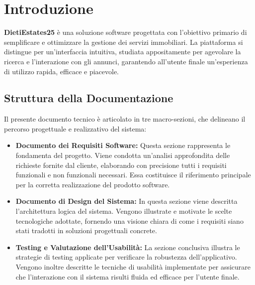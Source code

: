 \chapter*{Introduzione}

\textbf{DietiEstates25} è una soluzione software progettata con l'obiettivo primario di semplificare 
e ottimizzare la gestione dei servizi immobiliari. La piattaforma si distingue per un'interfaccia 
intuitiva, studiata appositamente per agevolare la ricerca e l'interazione con gli annunci, garantendo 
all'utente finale un'esperienza di utilizzo rapida, efficace e piacevole.

\section*{Struttura della Documentazione}

Il presente documento tecnico è articolato in tre macro-sezioni, che delineano il percorso progettuale 
e realizzativo del sistema:

\begin{itemize}
    \item \textbf{Documento dei Requisiti Software:} Questa sezione rappresenta le fondamenta del progetto. 
    Viene condotta un'analisi approfondita delle richieste fornite dal cliente, elaborando con precisione 
    tutti i requisiti funzionali e non funzionali necessari. Essa costituisce il riferimento principale 
    per la corretta realizzazione del prodotto software.

    \item \textbf{Documento di Design del Sistema:} In questa sezione viene descritta l'architettura 
    logica del sistema. Vengono illustrate e motivate le scelte tecnologiche adottate, fornendo una 
    visione chiara di come i requisiti siano stati tradotti in soluzioni progettuali concrete.

    \item \textbf{Testing e Valutazione dell'Usabilità:} La sezione conclusiva illustra le strategie 
    di testing applicate per verificare la robustezza dell'applicativo. Vengono inoltre descritte le 
    tecniche di usabilità implementate per assicurare che l'interazione con il sistema risulti fluida 
    ed efficace per l'utente finale.
\end{itemize}
